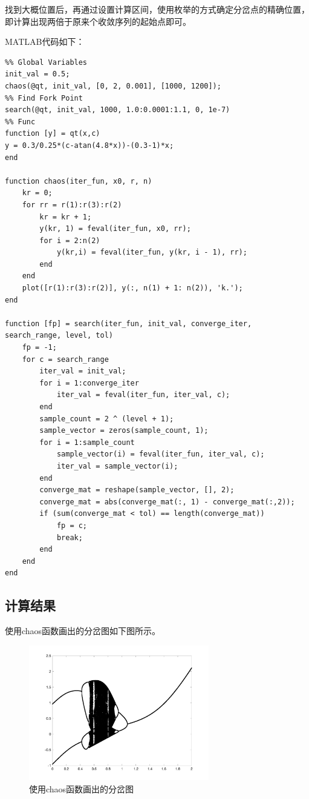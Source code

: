 \documentclass{article}
\begin{document}
找到大概位置后，再通过设置计算区间，使用枚举的方式确定分岔点的精确位置，即计算出现两倍于原来个收敛序列的起始点即可。

MATLAB代码如下：
\begin{lstlisting}
%% Global Variables
init_val = 0.5;
chaos(@qt, init_val, [0, 2, 0.001], [1000, 1200]);
%% Find Fork Point
search(@qt, init_val, 1000, 1.0:0.0001:1.1, 0, 1e-7)
%% Func
function [y] = qt(x,c)
y = 0.3/0.25*(c-atan(4.8*x))-(0.3-1)*x;
end

function chaos(iter_fun, x0, r, n)
    kr = 0;
    for rr = r(1):r(3):r(2)
        kr = kr + 1;
        y(kr, 1) = feval(iter_fun, x0, rr);
        for i = 2:n(2)
            y(kr,i) = feval(iter_fun, y(kr, i - 1), rr);
        end
    end
    plot([r(1):r(3):r(2)], y(:, n(1) + 1: n(2)), 'k.');
end

function [fp] = search(iter_fun, init_val, converge_iter, search_range, level, tol)
    fp = -1;
    for c = search_range
        iter_val = init_val;
        for i = 1:converge_iter
            iter_val = feval(iter_fun, iter_val, c);
        end
        sample_count = 2 ^ (level + 1);
        sample_vector = zeros(sample_count, 1);
        for i = 1:sample_count
            sample_vector(i) = feval(iter_fun, iter_val, c);
            iter_val = sample_vector(i);
        end
        converge_mat = reshape(sample_vector, [], 2);
        converge_mat = abs(converge_mat(:, 1) - converge_mat(:,2));
        if (sum(converge_mat < tol) == length(converge_mat))
            fp = c;
            break;
        end
    end
end
\end{lstlisting}

\subsection{计算结果}
使用chaos函数画出的分岔图如下图所示。
\begin{figure}[H]
    \centering
    \includegraphics[width=0.7\textwidth]{pic81.png}
    \caption{使用chaos函数画出的分岔图}
\end{figure}
\end{document}
